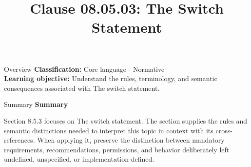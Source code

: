 \documentclass[10pt,letterpaper]{article}
\title{Clause 08.05.03: The Switch Statement}
\author{}
\date{}
\begin{document}
\maketitle
\begin{CornellOverviewBox}{Overview}
\textbf{Classification:} Core language - Normative\\[2pt]
\textbf{Learning objective:} Understand the rules, terminology, and semantic consequences associated with The switch statement.
\end{CornellOverviewBox}\begin{CornellSummaryBox}{Summary}
{\sffamily\bfseries\color{Accent} Summary}\par\vspace{3pt}Section 8.5.3 focuses on The switch statement. The section supplies the rules and semantic distinctions needed to interpret this topic in context with its cross-references. When applying it, preserve the distinction between mandatory requirements, recommendations, permissions, and behavior deliberately left undefined, unspecified, or implementation-defined.
\end{CornellSummaryBox}
\end{document}
